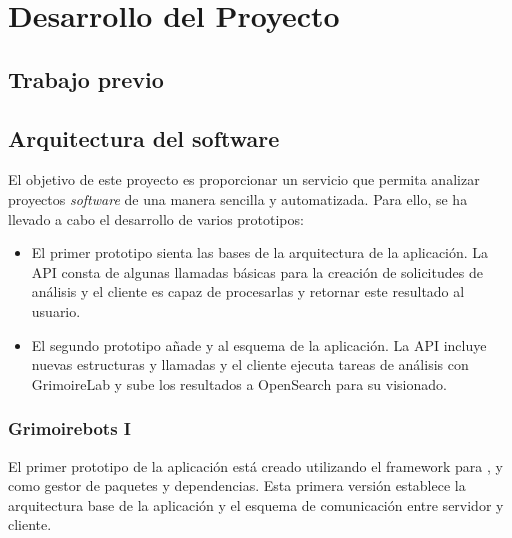 
\chapter{Desarrollo del Proyecto} %

\label{Chapter3} %


\section{Trabajo previo}


\section{Arquitectura del software}

El objetivo de este proyecto es proporcionar un servicio que permita analizar proyectos \emph{software} de una manera sencilla y automatizada. Para ello, se ha llevado a cabo el desarrollo de varios prototipos:

\begin{itemize}
    \item El primer prototipo sienta las bases de la arquitectura de la aplicación. La API consta de algunas llamadas básicas para la creación de solicitudes de análisis y el cliente es capaz de procesarlas y retornar este resultado al usuario.
    \item El segundo prototipo añade  y  al esquema de la aplicación. La API incluye nuevas estructuras y llamadas y el cliente ejecuta tareas de análisis con GrimoireLab y sube los resultados a OpenSearch para su visionado.
\end{itemize}

\subsection{Grimoirebots I}

El primer prototipo de la aplicación está creado utilizando el framework  para , y  como gestor de paquetes y dependencias. Esta primera versión establece la arquitectura base de la aplicación y el esquema de comunicación entre servidor y cliente.

